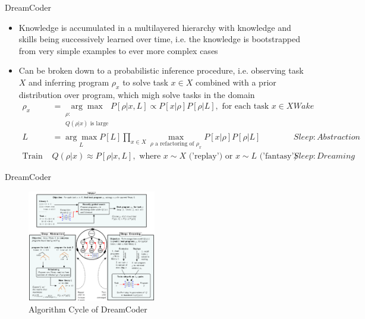 \documentclass[AERbeamer%
              ,optEnglish%
              ,optBiber%
              ,optBibstyleAlphabetic%
              ,optBeamerClassicFormat%
              ]{AERlatex}%
\begin{document}
\begin{frame}[c]{DreamCoder}
    \centering
    \begin{itemize}
        \item Knowledge is accumulated in a multilayered hierarchy with knowledge and skills being
              successively learned over time, i.e. the knowledge is bootstrapped from very simple
              examples to ever more complex cases
        \item Can be broken down to a probabilistic inference procedure, i.e. observing task $X$ and
              inferring program $\rho_{x}$ to solve task $x \in X$ combined with a prior distribution
              over program, which migh solve tasks in the domain
        \begin{align*}
            \rho_{x} &= \underset{\substack{\rho: \\ Q(\rho|x) \text{ is large}}}{\arg \max} P[\rho | x, L] \propto P[x | \rho ] P[\rho | L], \text{ for each task } x \in X &Wake \\
            L &= \underset{L}{\arg \max} P[L] \prod_{x \in X} \underset{\rho \text{ a refactoring of } \rho_{x}}{\max} P[x | \rho] P[\rho | L] &Sleep: Abstraction \\
            \text{Train } &Q(\rho | x) \approx P[\rho | x, L], \text{ where } x \sim X \text{ ('replay') or } x \sim L \text{ ('fantasy')} & Sleep: Dreaming
        \end{align*}
    \end{itemize}
\end{frame}


\begin{frame}[c]{DreamCoder}
    \centering
    \begin{figure}
        \centering
        \includegraphics[width=0.5\textwidth]{DreamCoderAlgorithmCycle.png}
        \caption{Algorithm Cycle of DreamCoder}
    \end{figure}
\end{frame}
\end{document}
